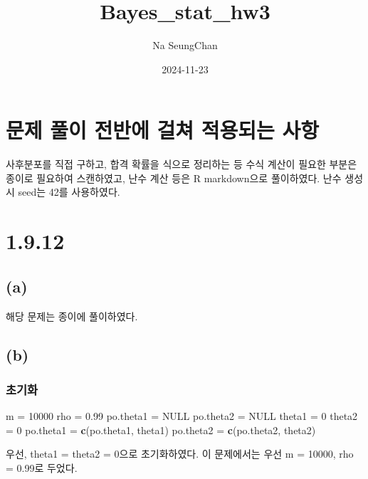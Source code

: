 \documentclass[
]{article}
\title{Bayes\_stat\_hw3}
\author{Na SeungChan}
\date{2024-11-23}
\newenvironment{Shaded}{\begin{snugshade}}{\end{snugshade}}
\newcommand{\ConstantTok}[1]{\textcolor[rgb]{0.56,0.35,0.01}{#1}}
\newcommand{\DecValTok}[1]{\textcolor[rgb]{0.00,0.00,0.81}{#1}}
\newcommand{\FloatTok}[1]{\textcolor[rgb]{0.00,0.00,0.81}{#1}}
\newcommand{\FunctionTok}[1]{\textcolor[rgb]{0.13,0.29,0.53}{\textbf{#1}}}
\newcommand{\NormalTok}[1]{#1}
\newcommand{\OtherTok}[1]{\textcolor[rgb]{0.56,0.35,0.01}{#1}}
\begin{document}
\maketitle

\section{문제 풀이 전반에 걸쳐 적용되는
사항}\label{uxbb38uxc81c-uxd480uxc774-uxc804uxbc18uxc5d0-uxac78uxccd0-uxc801uxc6a9uxb418uxb294-uxc0acuxd56d}

사후분포를 직접 구하고, 합격 확률을 식으로 정리하는 등 수식 계산이
필요한 부분은 종이로 필요하여 스캔하였고, 난수 계산 등은 R markdown으로
풀이하였다. 난수 생성 시 seed는 42를 사용하였다.

\section{1.9.12}\label{section}

\subsection{(a)}\label{a}

해당 문제는 종이에 풀이하였다.

\subsection{(b)}\label{b}

\subsubsection{초기화}\label{uxcd08uxae30uxd654}

\begin{Shaded}
\begin{Highlighting}[]
\NormalTok{m }\OtherTok{=} \DecValTok{10000}
\NormalTok{rho }\OtherTok{=} \FloatTok{0.99}
\NormalTok{po.theta1 }\OtherTok{=} \ConstantTok{NULL}
\NormalTok{po.theta2 }\OtherTok{=} \ConstantTok{NULL}
\NormalTok{theta1 }\OtherTok{=} \DecValTok{0}
\NormalTok{theta2 }\OtherTok{=} \DecValTok{0}
\NormalTok{po.theta1 }\OtherTok{=} \FunctionTok{c}\NormalTok{(po.theta1, theta1)}
\NormalTok{po.theta2 }\OtherTok{=} \FunctionTok{c}\NormalTok{(po.theta2, theta2) }
\end{Highlighting}
\end{Shaded}

우선, theta1 = theta2 = 0으로 초기화하였다. 이 문제에서는 우선 m =
10000, rho = 0.99로 두었다.
\end{document}
